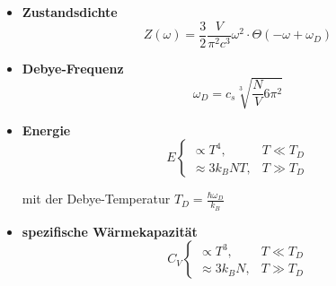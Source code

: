 \documentclass{article}
\begin{document}
	\begin{itemize}
		\item \textbf{Zustandsdichte}
			\begin{equation}
				Z(\omega) = \frac{3}{2}\frac{V}{\pi^2 c^3} \omega^2 \cdot \Theta(-\omega + \omega_D)
			\end{equation}
		
		
		\item \textbf{Debye-Frequenz}
			\begin{equation}
				\omega_D = c_s \sqrt[3]{\frac{N}{V}6\pi^2}
			\end{equation}
		
		
		\item \textbf{Energie}
			\begin{equation}
				E
				\begin{cases}
					\propto T^4, & T\ll T_D \\
					\approx 3k_B N T, & T\gg T_D
				\end{cases}
			\end{equation}
		
		mit der Debye-Temperatur $T_D = \frac{\hbar\omega_D}{k_B}$
		
		
		\item \textbf{spezifische Wärmekapazität}
			\begin{equation}
				C_V
				\begin{cases}
					\propto T^3, & T\ll T_D \\
					\approx 3 k_B N, & T\gg T_D
				\end{cases}
			\end{equation}
	\end{itemize}


\newpage
\end{document}
